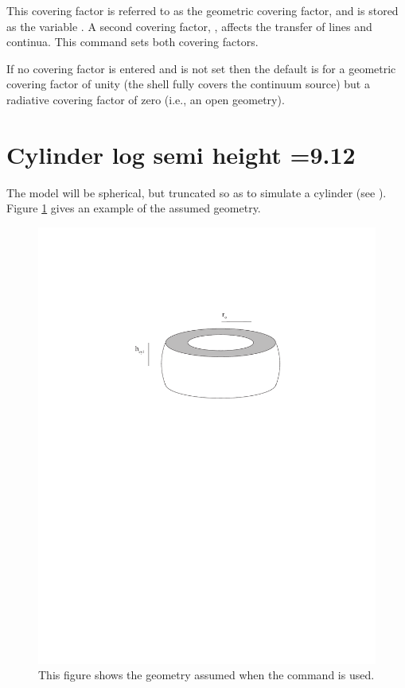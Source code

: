 This covering factor is referred to as the geometric covering factor,
and is stored as the variable .
A second covering factor,
,
affects the transfer of lines and continua.
This command sets both covering factors.

If no covering factor is entered and 
is not set then the default
is for a geometric covering factor of unity (the shell fully covers the
continuum source) but a radiative covering factor of zero (i.e., an open
geometry).

\section{Cylinder log semi height =9.12}

\noindent The model will be spherical,
but truncated so as to simulate a cylinder
(see \citealp{FerlandLambert1982}).
Figure \ref{fig:cylin} gives an example of the assumed geometry.

\begin{figure}
\centering
\includegraphics{cylin}
\caption[Cylindrical geometry]
{\label{fig:cylin}This figure shows the geometry assumed when the  command
is used.}
\end{figure}


